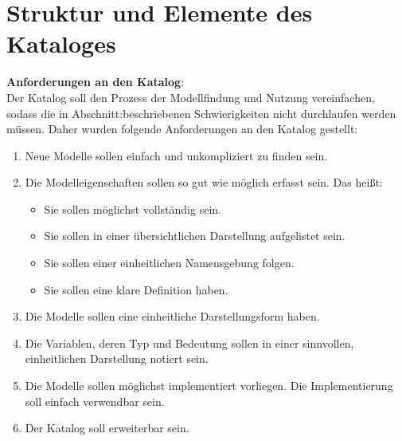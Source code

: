 \section{Struktur und Elemente des Kataloges} %
\label{Ch:ErstProz:Sec:Struktur}
\textbf{Anforderungen an den Katalog}:\\ %
Der Katalog soll den Prozess der Modellfindung und Nutzung vereinfachen, sodass die in Abschnitt:\glqq {}\grqq beschriebenen Schwierigkeiten nicht durchlaufen werden müssen. Daher wurden folgende Anforderungen an den Katalog gestellt:
\begin{enumerate}[label=\textbf{Anforderung A.\arabic*}:, ref=\textbf{A.\arabic*}, wide=0pt, leftmargin=*]
	\item \label{A.Findbarkeit}Neue Modelle sollen einfach und unkompliziert zu finden sein.
	\item \label{A.Modelleigenschaften}Die Modelleigenschaften sollen so gut wie möglich erfasst sein. Das heißt:
	\begin{itemize}[label=$\bullet$]
		\item Sie sollen möglichst vollständig sein.
		\item Sie sollen in einer übersichtlichen Darstellung aufgelistet sein.
		\item Sie sollen einer einheitlichen Namensgebung folgen.
		\item Sie sollen eine klare Definition haben.
	\end{itemize}
	\item \label{A.3}Die Modelle sollen eine einheitliche Darstellungsform haben.
	\item \label{A.4}Die Variablen, deren Typ und Bedeutung sollen in einer sinnvollen, einheitlichen Darstellung notiert sein.
	\item \label{A.5}Die Modelle sollen möglichst implementiert vorliegen. Die Implementierung soll einfach verwendbar sein.
	\item \label{A.Erweiterbarkeit}Der Katalog soll erweiterbar sein. %
\end{enumerate}

